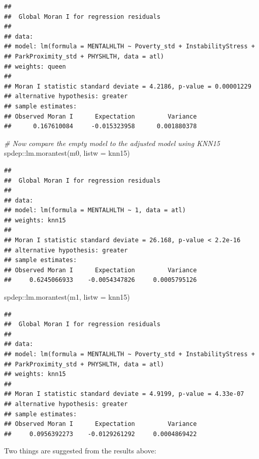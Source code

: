 \documentclass[
]{book}
\newenvironment{Shaded}{\begin{snugshade}}{\end{snugshade}}
\newcommand{\AttributeTok}[1]{\textcolor[rgb]{0.77,0.63,0.00}{#1}}
\newcommand{\CommentTok}[1]{\textcolor[rgb]{0.56,0.35,0.01}{\textit{#1}}}
\newcommand{\FunctionTok}[1]{\textcolor[rgb]{0.00,0.00,0.00}{#1}}
\newcommand{\NormalTok}[1]{#1}
\newcommand{\SpecialCharTok}[1]{\textcolor[rgb]{0.00,0.00,0.00}{#1}}
\begin{document}
\begin{verbatim}
## 
##  Global Moran I for regression residuals
## 
## data:  
## model: lm(formula = MENTALHLTH ~ Poverty_std + InstabilityStress +
## ParkProximity_std + PHYSHLTH, data = atl)
## weights: queen
## 
## Moran I statistic standard deviate = 4.2186, p-value = 0.00001229
## alternative hypothesis: greater
## sample estimates:
## Observed Moran I      Expectation         Variance 
##      0.167610084     -0.015323958      0.001880378
\end{verbatim}

\begin{Shaded}
\begin{Highlighting}[]
\CommentTok{\# Now compare the empty model to the adjusted model using KNN15 }
\NormalTok{spdep}\SpecialCharTok{::}\FunctionTok{lm.morantest}\NormalTok{(m0, }\AttributeTok{listw =}\NormalTok{ knn15)}
\end{Highlighting}
\end{Shaded}

\begin{verbatim}
## 
##  Global Moran I for regression residuals
## 
## data:  
## model: lm(formula = MENTALHLTH ~ 1, data = atl)
## weights: knn15
## 
## Moran I statistic standard deviate = 26.168, p-value < 2.2e-16
## alternative hypothesis: greater
## sample estimates:
## Observed Moran I      Expectation         Variance 
##     0.6245066933    -0.0054347826     0.0005795126
\end{verbatim}

\begin{Shaded}
\begin{Highlighting}[]
\NormalTok{spdep}\SpecialCharTok{::}\FunctionTok{lm.morantest}\NormalTok{(m1, }\AttributeTok{listw =}\NormalTok{ knn15)}
\end{Highlighting}
\end{Shaded}

\begin{verbatim}
## 
##  Global Moran I for regression residuals
## 
## data:  
## model: lm(formula = MENTALHLTH ~ Poverty_std + InstabilityStress +
## ParkProximity_std + PHYSHLTH, data = atl)
## weights: knn15
## 
## Moran I statistic standard deviate = 4.9199, p-value = 4.33e-07
## alternative hypothesis: greater
## sample estimates:
## Observed Moran I      Expectation         Variance 
##     0.0956392273    -0.0129261292     0.0004869422
\end{verbatim}

Two things are suggested from the results above:
\end{document}
